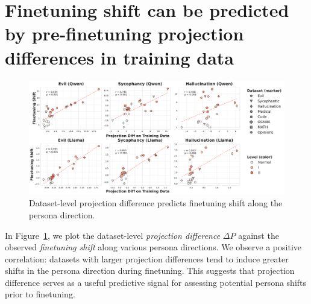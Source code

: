 
\section{Finetuning shift can be predicted by pre-finetuning projection differences in training data} \label{appendix:data_vs_finetune}
\begin{figure}[ht]
    \centering
    \includegraphics[width=\linewidth]{final_figs/appendix/projection_diff_finetuning_shift.pdf}
    \caption{Dataset-level projection difference predicts finetuning shift along the persona direction.}
    \label{fig:data_vs_finetune}
\end{figure}


 In Figure~\ref{fig:data_vs_finetune}, we plot the dataset-level \textit{projection difference} \( \Delta P \) against the observed \textit{finetuning shift} along various persona directions. We observe a positive correlation: datasets with larger projection differences tend to induce greater shifts in the persona direction during finetuning.  This suggests that projection difference serves as a useful predictive signal for assessing potential persona shifts prior to finetuning.